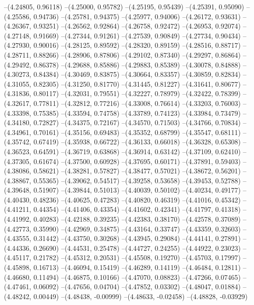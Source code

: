--(4.24805, 0.96118)
--(4.25000, 0.95782)
--(4.25195, 0.95439)
--(4.25391, 0.95090)
--(4.25586, 0.94736)
--(4.25781, 0.94375)
--(4.25977, 0.94006)
--(4.26172, 0.93631)
--(4.26367, 0.93251)
--(4.26562, 0.92864)
--(4.26758, 0.92472)
--(4.26953, 0.92074)
--(4.27148, 0.91669)
--(4.27344, 0.91261)
--(4.27539, 0.90849)
--(4.27734, 0.90434)
--(4.27930, 0.90016)
--(4.28125, 0.89592)
--(4.28320, 0.89159)
--(4.28516, 0.88717)
--(4.28711, 0.88266)
--(4.28906, 0.87806)
--(4.29102, 0.87340)
--(4.29297, 0.86864)
--(4.29492, 0.86378)
--(4.29688, 0.85886)
--(4.29883, 0.85389)
--(4.30078, 0.84888)
--(4.30273, 0.84384)
--(4.30469, 0.83875)
--(4.30664, 0.83357)
--(4.30859, 0.82834)
--(4.31055, 0.82305)
--(4.31250, 0.81770)
--(4.31445, 0.81227)
--(4.31641, 0.80677)
--(4.31836, 0.80117)
--(4.32031, 0.79551)
--(4.32227, 0.78979)
--(4.32422, 0.78399)
--(4.32617, 0.77811)
--(4.32812, 0.77216)
--(4.33008, 0.76614)
--(4.33203, 0.76003)
--(4.33398, 0.75385)
--(4.33594, 0.74758)
--(4.33789, 0.74123)
--(4.33984, 0.73479)
--(4.34180, 0.72827)
--(4.34375, 0.72167)
--(4.34570, 0.71503)
--(4.34766, 0.70834)
--(4.34961, 0.70161)
--(4.35156, 0.69483)
--(4.35352, 0.68799)
--(4.35547, 0.68111)
--(4.35742, 0.67419)
--(4.35938, 0.66722)
--(4.36133, 0.66018)
--(4.36328, 0.65308)
--(4.36523, 0.64591)
--(4.36719, 0.63868)
--(4.36914, 0.63142)
--(4.37109, 0.62410)
--(4.37305, 0.61674)
--(4.37500, 0.60928)
--(4.37695, 0.60171)
--(4.37891, 0.59403)
--(4.38086, 0.58621)
--(4.38281, 0.57827)
--(4.38477, 0.57021)
--(4.38672, 0.56201)
--(4.38867, 0.55365)
--(4.39062, 0.54517)
--(4.39258, 0.53658)
--(4.39453, 0.52788)
--(4.39648, 0.51907)
--(4.39844, 0.51013)
--(4.40039, 0.50102)
--(4.40234, 0.49177)
--(4.40430, 0.48236)
--(4.40625, 0.47283)
--(4.40820, 0.46319)
--(4.41016, 0.45342)
--(4.41211, 0.44354)
--(4.41406, 0.43354)
--(4.41602, 0.42341)
--(4.41797, 0.41318)
--(4.41992, 0.40283)
--(4.42188, 0.39235)
--(4.42383, 0.38170)
--(4.42578, 0.37089)
--(4.42773, 0.35990)
--(4.42969, 0.34875)
--(4.43164, 0.33747)
--(4.43359, 0.32603)
--(4.43555, 0.31442)
--(4.43750, 0.30268)
--(4.43945, 0.29084)
--(4.44141, 0.27891)
--(4.44336, 0.26690)
--(4.44531, 0.25478)
--(4.44727, 0.24255)
--(4.44922, 0.23023)
--(4.45117, 0.21782)
--(4.45312, 0.20531)
--(4.45508, 0.19270)
--(4.45703, 0.17997)
--(4.45898, 0.16713)
--(4.46094, 0.15419)
--(4.46289, 0.14119)
--(4.46484, 0.12811)
--(4.46680, 0.11494)
--(4.46875, 0.10166)
--(4.47070, 0.08823)
--(4.47266, 0.07465)
--(4.47461, 0.06092)
--(4.47656, 0.04704)
--(4.47852, 0.03302)
--(4.48047, 0.01884)
--(4.48242, 0.00449)
--(4.48438, -0.00999)
--(4.48633, -0.02458)
--(4.48828, -0.03929)
